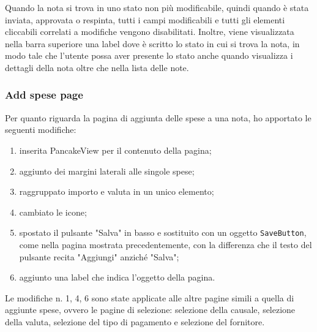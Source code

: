 \noindent Quando la nota si trova in uno stato non più modificabile, quindi quando è stata inviata, approvata o respinta, tutti i campi modificabili e tutti gli elementi cliccabili correlati a modifiche vengono disabilitati. Inoltre, viene visualizzata nella barra superiore una label dove è scritto lo stato in cui si trova la nota, in modo tale che l'utente possa aver presente lo stato anche quando visualizza i dettagli della nota oltre che nella lista delle note.

\clearpage

\subsubsection{Add spese page}

Per quanto riguarda la pagina di aggiunta delle spese a una nota, ho apportato le seguenti modifiche:
\begin{enumerate}
    \item inserita PancakeView per il contenuto della pagina;
    \item aggiunto dei margini laterali alle singole spese;
    \item raggruppato importo e valuta in un unico elemento;
    \item cambiato le icone;
    \item spostato il pulsante "Salva" in basso e sostituito con un oggetto \verb|SaveButton|, come nella pagina mostrata precedentemente, con la differenza che il testo del pulsante recita "Aggiungi" anziché "Salva";
    \item aggiunto una label che indica l'oggetto della pagina.
\end{enumerate}

\noindent Le modifiche n. 1, 4, 6 sono state applicate alle altre pagine simili a quella di aggiunte spese, ovvero le pagine di selezione: selezione della causale, selezione della valuta, selezione del tipo di pagamento e selezione del fornitore.


